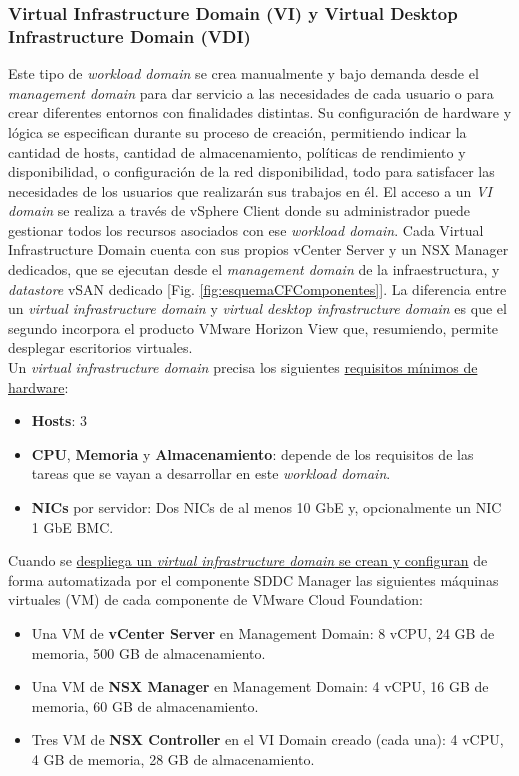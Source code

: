 \subsubsection{Virtual Infrastructure Domain (VI) y Virtual Desktop Infrastructure Domain (VDI)}
\label{subsubsec:domainVI}
Este tipo de \textit{workload domain} se crea manualmente y bajo demanda desde el \textit{management domain} para dar servicio a las necesidades de cada usuario o para crear diferentes entornos con finalidades distintas. Su configuración de hardware y lógica se especifican durante su proceso de creación, permitiendo indicar la cantidad de hosts, cantidad de almacenamiento, políticas de rendimiento y disponibilidad, o configuración de la red disponibilidad, todo para satisfacer las necesidades de los usuarios que realizarán sus trabajos en él. El acceso a un \textit{VI domain} se realiza a través de vSphere Client donde su administrador puede gestionar todos los recursos asociados con ese \textit{workload domain}. Cada Virtual Infrastructure Domain cuenta con sus propios vCenter Server y un NSX Manager dedicados, que se ejecutan desde el \textit{management domain} de la infraestructura, y \textit{datastore} vSAN dedicado [Fig. \ref{fig:esquemaCFComponentes}]. La diferencia entre un \textit{virtual infrastructure domain} y \textit{virtual desktop infrastructure domain} es que el segundo incorpora el producto VMware Horizon View que, resumiendo, permite desplegar escritorios virtuales.\\
Un \textit{virtual infrastructure domain} precisa los siguientes \underline{requisitos mínimos de hardware}:
\begin{itemize}
    \item \textbf{Hosts}: 3
    \item \textbf{CPU}, \textbf{Memoria} y \textbf{Almacenamiento}: depende de los requisitos de las tareas que se vayan a desarrollar en este \textit{workload domain}.
    \item \textbf{NICs} por servidor: Dos NICs de al menos 10 GbE y, opcionalmente un NIC 1 GbE BMC.
\end{itemize}

Cuando se \underline{despliega un \textit{virtual infrastructure domain} se crean y configuran} de forma automatizada por el componente SDDC Manager las siguientes máquinas virtuales (VM) de cada componente de VMware Cloud Foundation:
\begin{itemize}
    \item Una VM de \textbf{vCenter Server} en Management Domain: 8 vCPU, 24 GB de memoria, 500 GB de almacenamiento.
    \item Una VM de \textbf{NSX Manager} en Management Domain: 4 vCPU, 16 GB de memoria, 60 GB de almacenamiento.
    \item Tres VM de \textbf{NSX Controller} en el VI Domain creado (cada una):  4 vCPU, 4 GB de memoria, 28 GB de almacenamiento.
\end{itemize}

